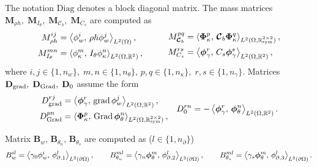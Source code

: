 The notation $\mathrm{Diag}$ denotes a block diagonal matrix. The mass matrices $\mathbf{M}_{\rho h}, \; \mathbf{M}_{I_\theta}, \; \mathbf{M}_{\bm{\mathcal{C}}_b}, \; \mathbf{M}_{{C}_s}$ are computed as
\begin{equation}
\begin{aligned}
M_{\rho h}^{ij} &= \inner[L^2(\Omega)]{\phi_w^i}{\rho h \phi_w^j}, \\
M_{I_\theta}^{mn} &= \inner[L^2(\Omega, \mathbb{R}^{2})]{\phi_\kappa^m}{I_\theta \phi_\kappa^n},
\end{aligned} \qquad
\begin{aligned}
\quad M_{\bm{\mathcal{C}}_b}^{pq} &= \inner[L^2(\Omega, \mathbb{R}^{2\times 2}_{\text{sym}})]{\bm\Phi_\kappa^p}{\bm{\mathcal{C}}_b \bm\Phi_\kappa^q}, \\
M_{C_s}^{rs} &= \inner[L^2(\Omega, \mathbb{R}^{2})]{\bm\phi_\gamma^r}{C_s \bm\phi_\gamma^s}, 
\end{aligned}
\end{equation}
where $i, j \in \{1, n_w\}, \; m, n \in \{1, n_\theta\}, \, p, q \in \{1, n_\kappa\}, \; r, s \in \{1, n_\gamma\}$. Matrices $\mathbf{D}_{\grad}, \; \mathbf{D}_{\Grad}, \; \mathbf{D}_{0}$ assume the form
\begin{equation}
\begin{aligned}
D_{\grad}^{rj} &= \inner[L^2(\Omega, \mathbb{R}^2)]{\bm\phi_\gamma^r}{\grad \phi_w^j}, \\ D_{\Grad}^{pn} &= \inner[L^2(\Omega, \mathbb{R}^{2\times 2}_{\text{sym}})]{\bm\Phi_\kappa^p}{\Grad \bm\phi_\theta^n},
\end{aligned} \quad
D_{0}^{rn} = -\inner[L^2(\Omega, \mathbb{R}^2)]{\bm\phi_\gamma^r}{\bm\phi_\theta^n}.
\end{equation}


Matrix $\mathbf{B}_w, \, \mathbf{B}_{\theta_n}, \, \mathbf{B}_{\theta_s}$ are computed as ($l \in \{1, n_\partial\}$)
\begin{equation}
{B}_w^{il} = \inner[L^2(\partial\Omega)]{\gamma_0 \phi_w^i}{\phi_{\partial, 1}^l}, \qquad {B}_{\theta_n}^{ml} = \inner[L^2(\partial\Omega)]{\gamma_n \bm\phi_\theta^m}{\phi_{\partial, 2}^l},  \qquad {B}_{\theta_s}^{ml} = \inner[L^2(\partial\Omega)]{\gamma_s \bm\phi_\theta^m}{\phi_{\partial, 3}^l}.
\end{equation}

